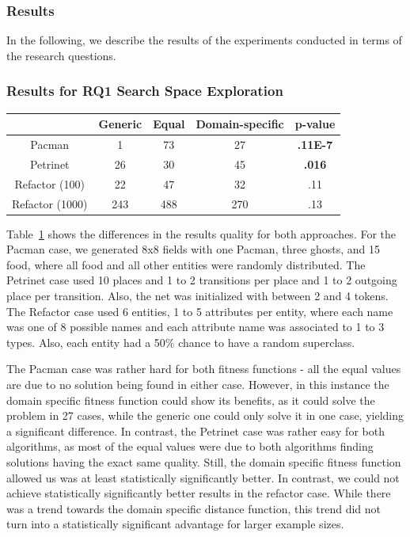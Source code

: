 

\subsubsection{Results}

In the following, we describe the results of the experiments conducted in terms of the research questions.

\subsubsection{Results for RQ1 Search Space Exploration}

\begin{table}
\centering
\begin{tabular}{|c|c|c|c|c|}
\hline
 & Generic & Equal & Domain-specific & p-value \\
\hline
Pacman & 1 & 73 & 27 & \textbf{.11E-7} \\
\hline
Petrinet & 26 & 30 & 45 & \textbf{.016} \\
\hline
Refactor (100) & 22 & 47 & 32 & .11 \\
\hline
Refactor (1000) & 243 & 488 & 270 & .13 \\
\hline
\end{tabular}
\label{tab:resultsrq1}
\end{table}

Table~\ref{tab:resultsrq1} shows the differences in the results quality for both approaches. 
 For the Pacman case, we generated 8x8 fields with one Pacman, three ghosts, and 15 food, where all food and all other entities were randomly distributed. The Petrinet case used 10 places and 1 to 2 transitions per place and 1 to 2 outgoing place per transition. Also, the net was initialized with between 2 and 4 tokens. The Refactor case used 6 entities, 1 to 5 attributes per entity, where each name was one of 8 possible names and each attribute name was associated to 1 to 3 types. Also, each entity had a 50\% chance to have a random superclass.

The Pacman case was rather hard for both fitness functions - all the equal values are due to no solution being found in either case. However, in this instance the domain specific fitness function could show its benefits, as it could solve the problem in 27 cases, while the generic one could only solve it in one case, yielding a significant difference. In contrast, the Petrinet case was rather easy for both algorithms, as most of the equal values were due to both algorithms finding solutions having the exact same quality. Still, the domain specific fitness function allowed us was at least statistically significantly better. In contrast, we could not achieve statistically significantly better results in the refactor case. While there was a trend towards the domain specific distance function, this trend did not turn into a statistically significant advantage for larger example sizes.

